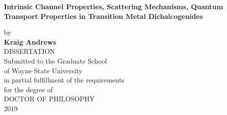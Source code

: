 \setcounter{page}{1} 
\thispagestyle{empty}
\begin{titlepage}


	\begin{center}

	\singlespacing
	\textbf{Intrinsic Channel Properties, Scattering Mechanisms, Quantum Transport Properties in Transition Metal Dichalcogenides}\\
	\doublespacing
	
	by\\
	
	\textbf{Kraig Andrews}\\
	DISSERTATION\\
	

	
	
	
	Submitted to the Graduate School\\
	
        of Wayne State University\\
	in partial fulfillment of the requirements\\
	for the degree of\\
	\vspace{0.8cm}
	DOCTOR OF PHILOSOPHY\\

	2019\\
	\end{center}
	\begin{flushright}
	\\
   \vspace{1.0cm}
	 \\
   \vspace{0.7cm}
	\makebox[8.7cm][l]{$\overline {\hspace{7.8cm}}$} \\
   \vspace{0.9cm}
	\makebox[8.7cm][l]{$\overline {\hspace{7.8cm}}$} \\
   \vspace{0.9cm}
	\makebox[8.7cm][l]{$\overline {\hspace{7.8cm}}$} \\
	
	\end{flushright}

	\end{titlepage}
